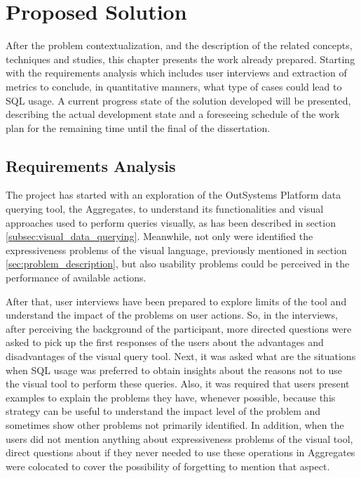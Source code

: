 \chapter{Proposed Solution}
\label{cha:proposed_solution}
After the problem contextualization, and the description of the related concepts, techniques and studies, this chapter presents the work already prepared. Starting with the requirements analysis which includes user interviews and extraction of metrics to conclude, in quantitative manners, what type of cases could lead to SQL usage. A current progress state of the solution developed will be presented, describing the actual development state and a foreseeing schedule of the work plan for the remaining time until the final of the dissertation.

\section{Requirements Analysis}
\label{sec:requirements_analysis}
The project has started with an exploration of the OutSystems Platform data querying tool, the Aggregates, to understand its functionalities and visual approaches used to perform queries visually, as has been described in section \ref{subsec:visual_data_querying}. Meanwhile, not only were identified the expressiveness problems of the visual language, previously mentioned in section \ref{sec:problem_description}, but also usability problems could be perceived in the performance of available actions. 

After that, user interviews have been prepared to explore limits of the tool and understand the impact of the problems on user actions. So, in the interviews, after perceiving the background of the participant, more directed questions were asked to pick up the first responses of the users about the advantages and disadvantages of the visual query tool. Next, it was asked what are the situations when SQL usage was preferred to obtain insights about the reasons not to use the visual tool to perform these queries. Also, it was required that users present examples to explain the problems they have, whenever possible, because this strategy can be useful to understand the impact level of the problem and sometimes show other problems not primarily identified. In addition, when the users did not mention anything about expressiveness problems of the visual tool, direct questions about if they never needed to use these operations in Aggregates were colocated to cover the possibility of forgetting to mention that aspect.

